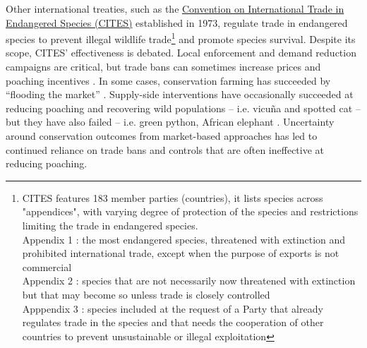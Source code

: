 Other international treaties, such as the \href{https://cites.org/fra}{Convention on International Trade in Endangered Species (CITES)} established in 1973, regulate trade in endangered species to prevent illegal wildlife trade\footnote{CITES features 183 member parties (countries), it lists species across "appendices", with varying degree of protection of the species and restrictions limiting the trade in endangered species.\\
Appendix 1 : the most endangered species, threatened with extinction and prohibited international trade, except when the purpose of exports is not commercial\\
Appendix 2 : species that are not necessarily now threatened with extinction but that may become so unless trade is closely controlled\\
Apppendix 3 : species included at the request of a Party that already regulates trade in the species and that needs the cooperation of other countries to prevent unsustainable or illegal exploitation} and promote species survival. Despite its scope, CITES’ effectiveness is debated. Local enforcement \citep{HEID2023102784} and demand reduction campaigns \citep{macfarlane_reducing_2022, moorhouse_demand_2024} are critical, but trade bans can sometimes increase prices and poaching incentives \citep{hsiang_does_2016}. In some cases, conservation farming has succeeded by “flooding the market” \citep{gentry_looking_2019, phelps_framework_2014, tensen_under_2016}. Supply-side interventions have occasionally succeeded at reducing poaching and recovering wild populations – i.e. vicuña and spotted cat \citep{iucn_world_2000, sahley_biological_2007} – but they have also failed – i.e. green python, African elephant \citep{lyons_wildlife_2011, hsiang_does_2016}. Uncertainty around conservation outcomes from market-based approaches has led to continued reliance on trade bans and controls that are often ineffective at reducing poaching.

